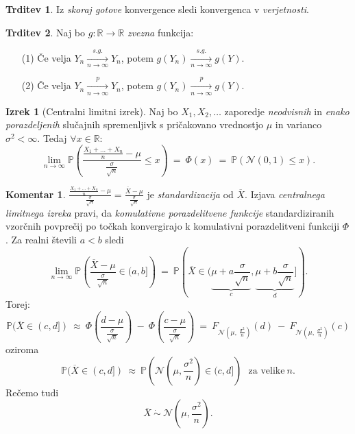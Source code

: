 \documentclass[11pt]{article}
\newcommand{\p}{\mathbb{P}}
\newcommand{\R}{\mathbb{R}}
\newcommand{\1}{\mathbbm{1}}
\newcommand{\n}{\mathcal{N}}
\theoremstyle{definition}
\theoremstyle{definition}
\newtheorem{trditev}{Trditev}[section]
\theoremstyle{definition}
\newtheorem{izrek}{Izrek}[section]
\newtheorem*{komentar}{Komentar}
\begin{document}
\begin{trditev}

Iz \textit{skoraj gotove} konvergence sledi konvergenca v \textit{verjetnosti}.

\end{trditev}
\vspace{0.5cm}

\begin{trditev}

Naj bo $g: \R \rightarrow \R$ \textit{zvezna} funkcija:
\begin{enumerate}

	\item[(1)] Če velja $Y_n \xrightarrow[n \rightarrow \infty]{s.g.} Y_n$, potem $g(Y_n) \xrightarrow[n \rightarrow \infty]{s.g.} g(Y)$.
	
	\item[(2)] Če velja $Y_n \xrightarrow[n \rightarrow \infty]{p} Y_n$, potem $g(Y_n) \xrightarrow[n \rightarrow \infty]{p} g(Y)$.

\end{enumerate}

\end{trditev}
\vspace{0.5cm}

\begin{izrek}[Centralni limitni izrek]

Naj bo $X_1, X_2, \ldots$ zaporedje \textit{neodvisnih} in \textit{enako porazdeljenih} slučajnih spremenljivk s pričakovano vrednostjo $\mu$ in varianco $\sigma^2 < \infty$. Tedaj $\forall x \in \R$:
$$\lim_{n \rightarrow \infty} \p \left( \frac{\frac{X_1 + \ldots + X_n}{n} - \mu}{\frac{\sigma}{\sqrt{n}}} \leq x \right) ~=~ \Phi(x) ~=~ \p(\n(0, 1) \leq x).$$

\end{izrek}
\vspace{0.5cm}

\begin{komentar}

$\frac{\frac{X_1 + \ldots + X_n}{n} - \mu}{\frac{\sigma}{\sqrt{n}}} = \frac{\overline{X} - \mu}{\frac{\sigma}{\sqrt{n}}}$ je \textit{standardizacija} od $\overline{X}$. Izjava \textit{centralnega limitnega izreka} pravi, da \textit{komulativne porazdelitvene funkcije} standardiziranih vzorčnih povprečij po točkah konvergirajo k komulativni porazdelitveni funkciji $\Phi$. Za realni števili $a<b$ sledi
$$\lim_{n \rightarrow \infty} \p \left( \frac{\overline{X} - \mu}{\frac{\sigma}{\sqrt{n}}} \in (a, b] \right) ~=~ \p \left( \overline{X} \in (\underbrace{\mu + a \frac{\sigma}{\sqrt{n}}}_{c}, \underbrace{\mu + b \frac{\sigma}{\sqrt{n}}}_{d}] \right).$$
Torej:
$$\p(\overline{X} \in (c, d]) ~\approx~ \Phi \left( \frac{d - \mu}{\frac{\sigma}{\sqrt{n}}} \right) ~-~ \Phi \left( \frac{c - \mu}{\frac{\sigma}{\sqrt{n}}} \right) ~=~ F_{\n(\mu, ~\frac{\sigma^2}{n})}(d) ~-~ F_{\n(\mu, ~\frac{\sigma^2}{n})}(c)$$
oziroma
$$\p(\overline{X} \in (c, d]) ~\approx~ \p \left(\n \left( \mu, \frac{\sigma^2}{n} \right) \in (c, d] \right) ~~~\text{za velike}~n.$$
Rečemo tudi
$$\overline{X} ~\dot{\sim}~ \n \left( \mu, \frac{\sigma^2}{n} \right).$$

\end{komentar}
\vspace{0.5cm}
\end{document}
